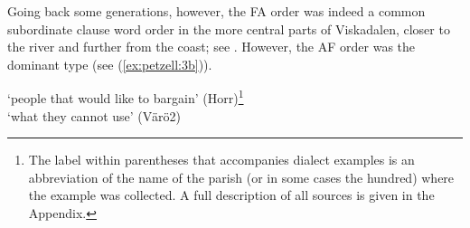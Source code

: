 \documentclass[output=paper,colorlinks,citecolor=brown,draft,draftmode]{langscibook}
\begin{document}
\ea\label{ex:petzell:2}
\z
\z

Going back some generations, however, the FA order was indeed a common subordinate clause word order in the more central parts of Viskadalen, closer to the river and further from the coast; see . However, the AF order was the dominant type (see (\ref{ex:petzell:3b})).


\ea\label{ex:petzell:3}
\glt `people that would like to bargain’ (Horr)\footnote{The label within parentheses that accompanies dialect examples is an abbreviation of the name of the parish (or in some cases the hundred) where the example was collected. A full description of all sources is given in the Appendix.}  \\
\glt `what they cannot use’ (Värö2)
\z
\z
\end{document}
